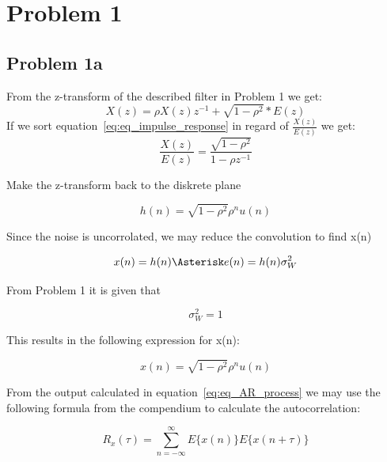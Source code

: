 \chapter{Problem 1}
  \section{Problem 1a}
	
	From the z-transform of the described filter in Problem 1 we get:
	\begin{equation}
		X(z)=\rho X(z)z^{-1}+\sqrt{1-\rho ^2}*E(z) 
		\label{eq:eq_impulse_response}
	\end{equation}
	If we sort equation~\ref{eq:eq_impulse_response} in regard of $\frac{X(z)}{E(z)}$ we get:
	\begin{equation*}
		\frac{X(z)}{E(z)}=\frac{\sqrt{1-\rho ^2}}{1-\rho z^{-1}}
		\label{eq:eq_freq_resp_x}
	\end{equation*}
	
	Make the z-transform back to the diskrete plane
	
	\begin{equation*}
		h(n)=\sqrt{1-\rho ^2}\rho ^nu(n)
	\end{equation*}
	
	Since the noise is uncorrolated, we may reduce the convolution to find x(n)
	
	\begin{equation*}
		x(n)=h(n)\Asterisk e(n)=h(n)\sigma ^2_W
	\end{equation*}
	
	From Problem 1 it is given that
	
	\begin{equation*}
		\sigma ^2_W=1
	\end{equation*}
	
	This results in the following expression for x(n):
	
	\begin{equation}
		x(n)=\sqrt{1-\rho ^2}\rho ^nu(n)
		\label{eq:eq_AR_process}
	\end{equation}
	
	From the output calculated in equation~\ref{eq:eq_AR_process} we may use the following formula from the compendium to calculate the autocorrelation:
	
	\begin{equation}
		R_x(\tau)=\sum_{n=-\infty}^{\infty}E\{x(n)\}E\{x(n+\tau)\}
		\label{eq:eq_autocorrelation_compendium}
	\end{equation}
	
